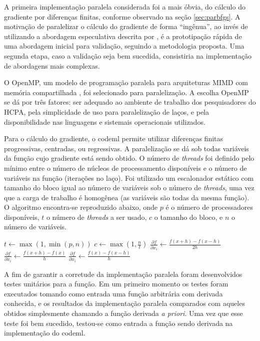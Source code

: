 \documentclass[cic,tc]{iiufrgs}
\begin{document}
A primeira implementação paralela considerada foi a mais óbvia, do cálculo do
gradiente por diferenças finitas, conforme observado na seção
\ref{sec:parbfgs}. A motivação de paralelizar o cálculo do gradiente de forma
``ingênua'', ao invés de utilizando a abordagem especulativa descrita por
\cite{byrd1988parallel}, é a prototipação rápida de uma abordagem inicial para
validação, seguindo a metodologia proposta. Uma segunda etapa, caso a validação
seja bem sucedida, consistiria na implementação de abordagens mais complexas.

O OpenMP, um modelo de programação paralela para arquiteturas MIMD com memória
compartilhada \cite{chandra2001parallel}, foi selecionado para paralelização. A
escolha OpenMP se dá por três fatores: ser adequado ao ambiente de trabalho dos
pesquisadores do HCPA, pela simplicidade de uso para paralelização de laços, e
pela disponibilidade nas linguagens e sistemais operacionais utilizados.

Para o cálculo do gradiente, o codeml permite utilizar diferenças finitas
progressivas, centradas, ou regressivas. A paralelização se dá sob todas
variáveis da função cujo gradiente está sendo obtido. O número de
\textit{threads} foi definido pelo mínimo entre o número de núcleos de
processamento disponíveis e o número de variáveis na função (iterações no
laço). Foi utilizado um escalonador estático com tamanho do bloco igual ao
número de variáveis sob o número de \textit{threads}, uma vez que a carga de
trabalho é homogênea (as variáveis são todas da mesma função). O algoritmo
encontra-se reproduzido abaixo, onde $p$ é o número de processadores
disponíveis, $t$ o número de \textit{threads} a ser usado, $c$ o tamanho do
bloco, e $n$ o número de variáveis.

\begin{algorithmic}
\State $t \gets \max(1, \min(p, n))$
\State $c \gets \max(1, \frac{n}{t})$
    \State $\frac{\partial f}{\partial x_i} \gets \frac{f(x+h)-f(x-h)}{2h}$
    \State $\frac{\partial f}{\partial x_i} \gets \frac{f(x+h)-f(x)}{h}$
  \Else
    \State $\frac{\partial f}{\partial x_i} \gets \frac{f(x)-f(x-h)}{h}$
  \EndIf
\EndFor
\end{algorithmic}

A fim de garantir a corretude da implementação paralela foram desenvolvidos
testes unitários para a função. Em um primeiro momento os testes foram
executados tomando como entrada uma função arbitrária com derivada conhecida,
e os resultados da implementação paralela comparados com aqueles obtidos
simplesmente chamando a função derivada \textit{a priori}. Uma vez que esse
teste foi bem sucedido, testou-se como entrada a função sendo derivada na
implementação do codeml.
\end{document}
